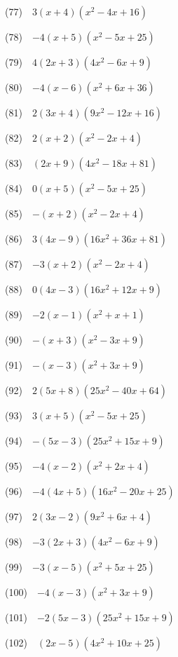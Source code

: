 \documentclass[a4j,twocolumn,10pt,fleqn]{jarticle}
\begin{document}
(77)~~$3\left(x + 4\right) \left(x^{2} - 4 x + 16\right)$

(78)~~$-4\left(x + 5\right) \left(x^{2} - 5 x + 25\right)$

(79)~~$4\left(2 x + 3\right) \left(4 x^{2} - 6 x + 9\right)$

(80)~~$-4\left(x - 6\right) \left(x^{2} + 6 x + 36\right)$

(81)~~$2\left(3 x + 4\right) \left(9 x^{2} - 12 x + 16\right)$

(82)~~$2\left(x + 2\right) \left(x^{2} - 2 x + 4\right)$

(83)~~$\left(2 x + 9\right) \left(4 x^{2} - 18 x + 81\right)$

(84)~~$0\left(x + 5\right) \left(x^{2} - 5 x + 25\right)$

(85)~~$-\left(x + 2\right) \left(x^{2} - 2 x + 4\right)$

(86)~~$3\left(4 x - 9\right) \left(16 x^{2} + 36 x + 81\right)$

(87)~~$-3\left(x + 2\right) \left(x^{2} - 2 x + 4\right)$

(88)~~$0\left(4 x - 3\right) \left(16 x^{2} + 12 x + 9\right)$

(89)~~$-2\left(x - 1\right) \left(x^{2} + x + 1\right)$

(90)~~$-\left(x + 3\right) \left(x^{2} - 3 x + 9\right)$

(91)~~$-\left(x - 3\right) \left(x^{2} + 3 x + 9\right)$

(92)~~$2\left(5 x + 8\right) \left(25 x^{2} - 40 x + 64\right)$

(93)~~$3\left(x + 5\right) \left(x^{2} - 5 x + 25\right)$

(94)~~$-\left(5 x - 3\right) \left(25 x^{2} + 15 x + 9\right)$

(95)~~$-4\left(x - 2\right) \left(x^{2} + 2 x + 4\right)$

(96)~~$-4\left(4 x + 5\right) \left(16 x^{2} - 20 x + 25\right)$

(97)~~$2\left(3 x - 2\right) \left(9 x^{2} + 6 x + 4\right)$

(98)~~$-3\left(2 x + 3\right) \left(4 x^{2} - 6 x + 9\right)$

(99)~~$-3\left(x - 5\right) \left(x^{2} + 5 x + 25\right)$

(100)~~$-4\left(x - 3\right) \left(x^{2} + 3 x + 9\right)$

(101)~~$-2\left(5 x - 3\right) \left(25 x^{2} + 15 x + 9\right)$

(102)~~$\left(2 x - 5\right) \left(4 x^{2} + 10 x + 25\right)$
\end{document}
